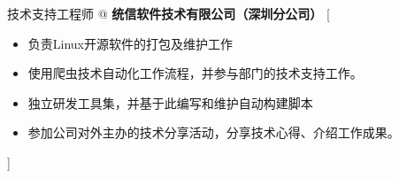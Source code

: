 \documentclass[zh]{resume}
\begin{document}
\begin{experiences}
    {技术支持工程师 @ \textbf{统信软件技术有限公司（深圳分公司）}}%
    [\begin{itemize}
		\item 负责Linux开源软件的打包及维护工作
		\item 使用爬虫技术自动化工作流程，并参与部门的技术支持工作。
		\item 独立研发工具集，并基于此编写和维护自动构建脚本
		\item 参加公司对外主办的技术分享活动，分享技术心得、介绍工作成果。
    \end{itemize}]
\end{experiences}
\end{document}
